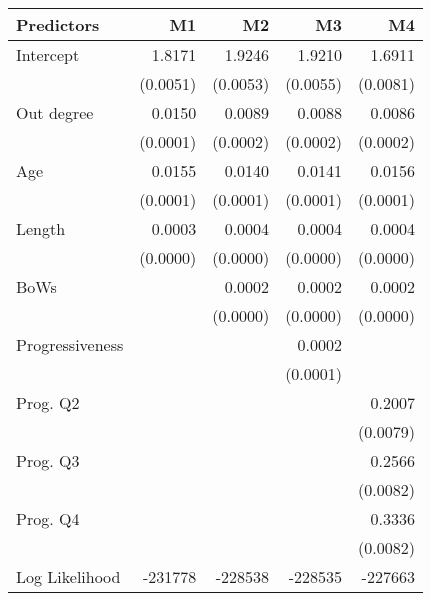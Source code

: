\begin{tabular}{lrrrr}
\toprule
Predictors & M1 & M2 & M3 & M4 \\
\midrule
Intercept & 1.8171 & 1.9246 & 1.9210 & 1.6911\\
  & (0.0051) & (0.0053) & (0.0055) & (0.0081)\\[4pt]
Out degree & 0.0150 & 0.0089 & 0.0088 & 0.0086\\
  & (0.0001) & (0.0002) & (0.0002) & (0.0002)\\[4pt]
Age & 0.0155 & 0.0140 & 0.0141 & 0.0156\\
  & (0.0001) & (0.0001) & (0.0001) & (0.0001)\\[4pt]
Length & 0.0003 & 0.0004 & 0.0004 & 0.0004\\
  & (0.0000) & (0.0000) & (0.0000) & (0.0000)\\[4pt]
BoWs &   & 0.0002 & 0.0002 & 0.0002\\
  &   & (0.0000) & (0.0000) & (0.0000)\\[4pt]
Progressiveness &   &   & 0.0002 &  \\
  &   &   & (0.0001) &  \\[4pt]
Prog. Q2 &   &   &   & 0.2007\\
  &   &   &   & (0.0079)\\[4pt]
Prog. Q3 &   &   &   & 0.2566\\
  &   &   &   & (0.0082)\\[4pt]
Prog. Q4 &   &   &   & 0.3336\\
  &   &   &   & (0.0082)\\[4pt]
Log Likelihood & -231778 & -228538 & -228535 & -227663
\\
\bottomrule
\end{tabular}

